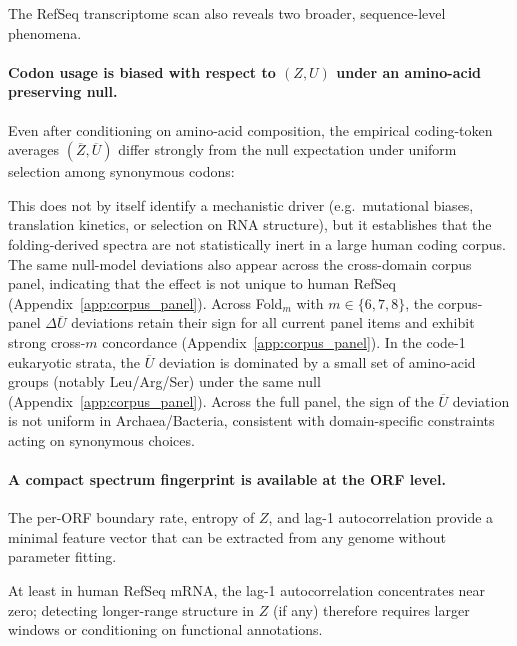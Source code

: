 The RefSeq transcriptome scan also reveals two broader, sequence-level phenomena.

\paragraph{Codon usage is biased with respect to $(Z,U)$ under an amino-acid preserving null.}
Even after conditioning on amino-acid composition, the empirical coding-token averages $(\overline{Z},\overline{U})$ differ strongly from the null expectation under uniform selection among synonymous codons:

This does not by itself identify a mechanistic driver (e.g.\ mutational biases, translation kinetics, or selection on RNA structure), but it establishes that the folding-derived spectra are not statistically inert in a large human coding corpus.
The same null-model deviations also appear across the cross-domain corpus panel, indicating that the effect is not unique to human RefSeq (Appendix~\ref{app:corpus_panel}).
Across Fold$_m$ with $m\in\{6,7,8\}$, the corpus-panel $\Delta\overline{U}$ deviations retain their sign for all current panel items and exhibit strong cross-$m$ concordance (Appendix~\ref{app:corpus_panel}).
In the code-1 eukaryotic strata, the $\overline{U}$ deviation is dominated by a small set of amino-acid groups (notably Leu/Arg/Ser) under the same null (Appendix~\ref{app:corpus_panel}).
Across the full panel, the sign of the $\overline{U}$ deviation is not uniform in Archaea/Bacteria, consistent with domain-specific constraints acting on synonymous choices.

\paragraph{A compact spectrum fingerprint is available at the ORF level.}
The per-ORF boundary rate, entropy of $Z$, and lag-1 autocorrelation provide a minimal feature vector that can be extracted from any genome without parameter fitting.
\par\noindent\par
At least in human RefSeq mRNA, the lag-1 autocorrelation concentrates near zero; detecting longer-range structure in $Z$ (if any) therefore requires larger windows or conditioning on functional annotations.

